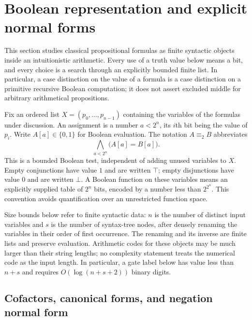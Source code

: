 \section{Boolean representation and explicit normal forms}
\label{ca-normal}

This section studies classical propositional formulas as finite syntactic
objects inside an intuitionistic arithmetic.  Every use of a truth value below
means a bit, and every choice is a search through an explicitly bounded finite
list.  In particular, a case distinction on the value of a formula is a case
distinction on a primitive recursive Boolean computation; it does not assert
excluded middle for arbitrary arithmetical propositions.

Fix an ordered list $X=(p_0,\ldots,p_{n-1})$ containing the variables of the
formulas under discussion.  An assignment is a number $a<2^n$, its $i$th bit
being the value of $p_i$.  Write $A[a]\in\{0,1\}$ for Boolean evaluation.
The notation $A\equiv_2 B$ abbreviates
\[
  \bigwedge_{a<2^n}\bigl(A[a]=B[a]\bigr).
\]
This is a bounded Boolean test, independent of adding unused variables to $X$.
Empty conjunctions have value $1$ and are written $\top$; empty disjunctions
have value $0$ and are written $\bot$.  A Boolean function on these variables
means an explicitly supplied table of $2^n$ bits, encoded by a number less than
$2^{2^n}$.  This convention avoids quantification over an unrestricted
function space.

Size bounds below refer to finite syntactic data: $n$ is the number of
distinct input variables and $s$ is the number of syntax-tree nodes, after
densely renaming the variables in their order of first occurrence.  The
renaming and its inverse are finite lists and preserve evaluation.
Arithmetic codes for these objects may be much larger than their string
lengths; no complexity statement treats the numerical code as the input
length.  In particular, a gate label below has value less than $n+s$ and
requires $O(\log(n+s+2))$ binary digits.

\subsection{Cofactors, canonical forms, and negation normal form}

